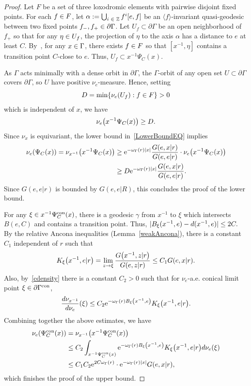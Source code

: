 \documentclass[AHL,Unicode,longabstracts]{cedram}
\newcommand{\pG}{\partial{\Gamma}}
\newcommand{\Z}{\mathbb{Z}}
\newcommand{\rme}{\mathrm{e}}
\DeclareMathOperator{\con}{con}
\let\originalleft\left
\let\originalright\right
\renewcommand{\left}{\mathopen{}\mathclose\bgroup\originalleft}
\renewcommand{\right}{\aftergroup\egroup\originalright}
\let\oldin\in
\renewcommand{\in}{\mathchoice{\oldin}{\oldin}{\,\oldin\,}{\,\oldin\,}}
\let\oldge\ge
\renewcommand{\ge}{\mathchoice{\oldge}{\oldge}{\,\oldge\,}{\,\oldge\,}}
\let\oldle\le
\renewcommand{\le}{\mathchoice{\oldle}{\oldle}{\,\oldle\,}{\,\oldle\,}}
\renewcommand*{\to}{\mathchoice{\longrightarrow}{\rightarrow}{\rightarrow}{\rightarrow}}
\begin{document}
\begin{proof}
Let $F$ be a set of three loxodromic elements with pairwise disjoint fixed points. For each $f\in F$, let $\alpha:=\bigcup_{i\in \Z} f^i[e,f]$ be an $\langle f\rangle$-invariant quasi-geodesic between two fixed points $f_-,f_+\in\pG$. Let $U_f\subset \pG$ be an open neighborhood of $f_+$ so that for any $\eta\in U_f$, the projection of $\eta$ to the axis $\alpha$ has a distance to $e$ at least $C$. By~\cite[Lemma~2.4]{DWY}, for any $x\in \Gamma$, there exists $f\in F$ so that $[x^{-1},\eta]$ contains a transition point $C$-close to $e$. Thus, $U_f\subset x^{-1}\Psi_{C}(x)$.

As $\Gamma$ acts minimally with a dense orbit in $\pG$, the $\Gamma$-orbit of any open set $U\subset \pG$ covers $\pG$, so $U$ have positive $\nu_e$-measure. Hence, setting
\[
D=\min\{\nu_e(U_f): f\in F\}>0
\]
which is independent of $x$, we have
\[
\nu_e\left(x^{-1}\Psi_{C}(x)\right) \ge D.
\]
Since $\nu_x $ is equivariant, the lower bound in~\eqref{LowerBoundEQ} implies
\begin{align*}
\nu_e(\Psi_{C}(x))={\nu_{x^{-1}}\left(x^{-1}\Psi_{C}(x)\right)}&\ge \rme^{-\omega_\Gamma(r) |x|}\frac{G(e,x|r) }{G(e,e|r)}\cdot {\nu_e\left(x^{-1}\Psi_C(x)\right)}\\
&\ge D \rme^{-\omega_\Gamma(r) |x|}\frac{G(e,x|r)}{G(e,e|r)}.
\end{align*}
Since $G(e,e|r)$ is bounded by $G(e,e|R)$, this concludes the proof of the lower bound.

For any $\xi \in x^{-1} \Psi^{\con}_C(x)$, there is a geodesic $\gamma$ from $x^{-1}$ to $\xi$ which intersects $B(e, C)$ and contains a transition point. Thus, $|B_\xi(x^{-1},e)
- d(x^{-1}, e)| \le 2C.$ By the relative Ancona inequalities (Lemma~\ref{weakAncona}), there is a constant $C_1$ independent of $r$ such that
\[
K_\xi\left(x^{-1}, e|r\right) = \lim_{z\to \xi}\frac{G\left(x^{-1},z|r\right)}{G(e,z|r)}
\le C_1 G(e,x|r).
\]
Also, by~\eqref{cdensity} there is a constant $C_2>0$ such that for $\nu_e$-a.e. conical limit point $\xi \in \pG^{\con}$,
\[
\frac{d\nu_{x^{-1}}}{d\nu_e}(\xi) \le C_2 \rme^{-\omega_\Gamma(r) B_\xi\left(x^{-1},e\right)} K_\xi\left(x^{-1}, e| r\right).
\]
Combining together the above estimates, we have
\begin{align*}
\nu_e(\Psi^{\con}_C(x)) & = \nu_{x^{-1}}\left(x^{-1}\Psi^{\con}_C(x)\right) \\
& \le C_2\int_{x^{-1}\Psi^{\con}_C(x)} \rme^{-\omega_\Gamma(r) B_\xi\left(x^{-1},e\right)} K_\xi\left(x^{-1}, e|r\right) d \nu_e(\xi) \\
& \leq C_1C_2 \rme^{2C\omega_\Gamma(r)} \cdot \rme^{-\omega_\Gamma(r) |x|} G(e,x|r),
\end{align*}
which finishes the proof of the upper bound.
\end{proof}
\end{document}
